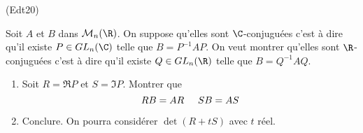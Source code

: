 \begin{tiny}(Edt20)\end{tiny} Soit $A$ et $B$ dans $\mathcal{M}_n(\R)$. On suppose qu'elles sont $\C$-conjuguées c'est à dire qu'il existe $P\in GL_n(\C)$ telle que $B=P^{-1} A P$. On veut montrer qu'elles sont $\R$-conjuguées c'est à dire qu'il existe $Q\in GL_n(\R)$ telle que $B=Q^{-1} A Q$.
\begin{enumerate}
 \item Soit $R=\Re P$ et $S =\Im P$. Montrer que 
\begin{displaymath}
 RB=AR \hspace{0.5cm} SB=AS
\end{displaymath}
 \item Conclure. On pourra considérer $\det(R+tS)$ avec $t$ réel.
\end{enumerate}
 